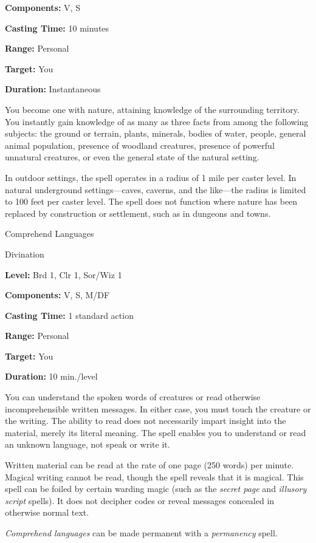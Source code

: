 \documentclass{article}
\begin{document}
\textbf{Components:} V, S

\textbf{Casting Time:} 10 minutes

\textbf{Range:} Personal

\textbf{Target:} You

\textbf{Duration:} Instantaneous

You become one with nature, attaining knowledge of the surrounding territory. You 
instantly gain knowledge of as many as three facts from among the following subjects: 
the ground or terrain, plants, minerals, bodies of water, people, general animal 
population, presence of woodland creatures, presence of powerful unnatural creatures, 
or even the general state of the natural setting.

In outdoor settings, the spell operates in a radius of 1 mile per caster level. 
In natural underground settings---caves, caverns, and the like---the radius is 
limited to 100 feet per caster level. The spell does not function where nature 
has been replaced by construction or settlement, such as in dungeons and towns.

\vspace{12pt}
Comprehend Languages

Divination

\textbf{Level:} Brd 1, Clr 1, Sor/Wiz 1

\textbf{Components:} V, S, M/DF

\textbf{Casting Time:} 1 standard action

\textbf{Range:} Personal

\textbf{Target:} You

\textbf{Duration:} 10 min./level

You can understand the spoken words of creatures or read otherwise incomprehensible 
written messages. In either case, you must touch the creature or the writing. The 
ability to read does not necessarily impart insight into the material, merely its 
literal meaning. The spell enables you to understand or read an unknown language, 
not speak or write it.

Written material can be read at the rate of one page (250 words) per minute. Magical 
writing cannot be read, though the spell reveals that it is magical. This spell 
can be foiled by certain warding magic (such as the \textit{secret page }and \textit{illusory 
script }spells). It does not decipher codes or reveal messages concealed in otherwise 
normal text.

\textit{Comprehend languages }can be made permanent with a \textit{permanency }spell.
\end{document}
